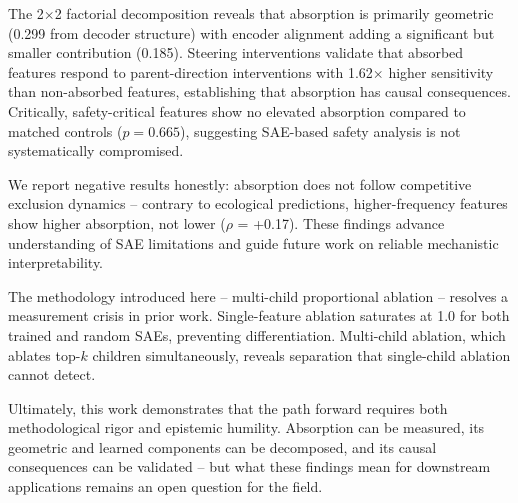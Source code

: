 \documentclass{article}
\begin{document}
The 2$\times$2 factorial decomposition reveals that absorption is primarily geometric (0.299 from decoder structure) with encoder alignment adding a significant but smaller contribution (0.185). Steering interventions validate that absorbed features respond to parent-direction interventions with 1.62$\times$ higher sensitivity than non-absorbed features, establishing that absorption has causal consequences. Critically, safety-critical features show no elevated absorption compared to matched controls ($p = 0.665$), suggesting SAE-based safety analysis is not systematically compromised.

We report negative results honestly: absorption does not follow competitive exclusion dynamics -- contrary to ecological predictions, higher-frequency features show higher absorption, not lower ($\rho$ = +0.17). These findings advance understanding of SAE limitations and guide future work on reliable mechanistic interpretability.

The methodology introduced here -- multi-child proportional ablation -- resolves a measurement crisis in prior work. Single-feature ablation saturates at 1.0 for both trained and random SAEs, preventing differentiation. Multi-child ablation, which ablates top-$k$ children simultaneously, reveals separation that single-child ablation cannot detect.

Ultimately, this work demonstrates that the path forward requires both methodological rigor and epistemic humility. Absorption can be measured, its geometric and learned components can be decomposed, and its causal consequences can be validated -- but what these findings mean for downstream applications remains an open question for the field.



\end{document}
